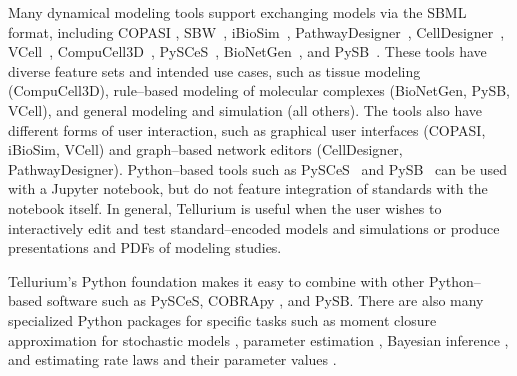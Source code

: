 \documentclass[10pt,letterpaper]{article}
\begin{document}
Many dynamical modeling tools support exchanging models via the SBML format, including COPASI \cite{hoops2006copasi,mendes2009computational}, SBW~\cite{bergmann2006sbw}, iBioSim~\cite{myers2009ibiosim}, PathwayDesigner~\cite{pathwaydesigner}, CellDesigner~\cite{Funahashi2008,Funahashi2003159}, VCell~\cite{moraru2008virtual,schaff2016rule,vcell2017}, CompuCell3D~\cite{swat2012multi}, PySCeS~\cite{olivier2005modelling}, BioNetGen~\cite{blinov2004bionetgen}, and PySB~\cite{lopez2013programming}. These tools have diverse feature sets and intended use cases, such as tissue modeling (CompuCell3D), rule--based modeling of molecular complexes (BioNetGen, PySB, VCell), and general modeling and simulation (all others). The tools also have different forms of user interaction, such as graphical user interfaces (COPASI, iBioSim, VCell) and graph--based network editors (CellDesigner, PathwayDesigner). Python--based tools such as PySCeS~\cite{olivier2005modelling} and PySB~\cite{lopez2013programming} can be used with a Jupyter notebook, but do not feature integration of standards with the notebook itself. In general, Tellurium is useful when the user wishes to interactively edit and test standard--encoded models and simulations or produce presentations and PDFs of modeling studies. %


Tellurium's Python foundation makes it easy to combine with other Python--based software such as PySCeS, COBRApy \cite{ebrahim2013cobrapy}, and PySB. There are also many specialized Python packages for specific tasks such as moment closure approximation for stochastic models \cite{fan2016means}, parameter estimation \cite{Swaminathan121152}, Bayesian inference \cite{liepe2010abc}, and estimating rate laws and their parameter values \cite{Theisen065177}. %
\end{document}
